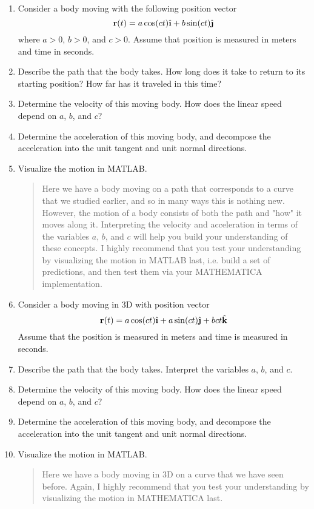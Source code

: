 \documentclass[M3_Night1_Solutions]{subfiles}
\begin{document}
\begin{enumerate}[series=exercises, label=\textbf{Exercise} (\arabic*)]
\begin{enumerate}[resume=exercises, label=\textbf{Exercise} (\arabic*)]
\item Consider a body moving with the following position vector
\[\r(t) = a \cos(c t) \ihat + b \sin (c t) \jhat \]
where $a>0$, $b>0$, and $c > 0$. Assume that position is measured in meters and time in seconds.
\be
\item Describe the path that the body takes. How long does it take to return to its starting position? How far has it traveled in this time?
\item Determine the velocity of this moving body. How does the linear speed depend on $a$, $b$, and $c$?
\item Determine the acceleration of this moving body, and decompose the acceleration into the unit tangent and unit normal directions.
\item Visualize the motion in MATLAB.
\ee
\begin{quote}
Here we have a body moving on a path that corresponds to a curve that we studied earlier, and so in many ways this is nothing new. However, the motion of a body consists of both the path and "how" it moves along it. Interpreting the velocity and acceleration in terms of the variables $a$, $b$, and $c$ will help you build your understanding of these concepts. I highly recommend that you test your understanding by visualizing the motion in MATLAB last, i.e. build a set of predictions, and then test them via your MATHEMATICA implementation.
\end{quote}

\item Consider a body moving in 3D with position vector
\[\r(t) = a \cos(c t) \ihat + a \sin(c t) \jhat + b c t \khat \]
Assume that the position is measured in meters and time is measured in seconds.
\be
\item Describe the path that the body takes. Interpret the variables $a$, $b$, and $c$.
\item Determine the velocity of this moving body. How does the linear speed depend on $a$, $b$, and $c$?
\item Determine the acceleration of this moving body, and decompose the acceleration into the unit tangent and unit normal directions.
\item Visualize the motion in MATLAB.
\ee
\begin{quote}
Here we have a body moving in 3D on a curve that we have seen before. Again, I highly recommend that you test your understanding by visualizing the motion in MATHEMATICA last.
\end{quote}


\end{enumerate}
\end{enumerate}
\end{document}

